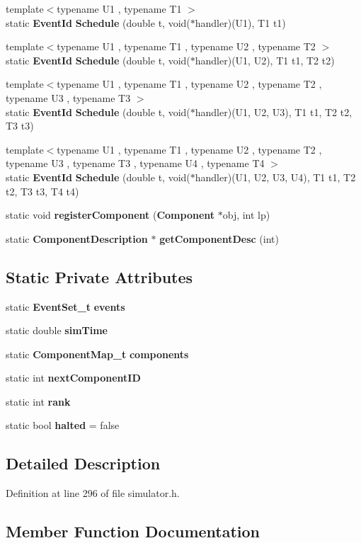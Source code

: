 \begin{CompactItemize}
{\footnotesize template$<$typename U1 , typename T1 $>$ }\\static {\bf EventId} {\bf Schedule} (double t, void($\ast$handler)(U1), T1 t1)
\item 
{\footnotesize template$<$typename U1 , typename T1 , typename U2 , typename T2 $>$ }\\static {\bf EventId} {\bf Schedule} (double t, void($\ast$handler)(U1, U2), T1 t1, T2 t2)
\item 
{\footnotesize template$<$typename U1 , typename T1 , typename U2 , typename T2 , typename U3 , typename T3 $>$ }\\static {\bf EventId} {\bf Schedule} (double t, void($\ast$handler)(U1, U2, U3), T1 t1, T2 t2, T3 t3)
\item 
{\footnotesize template$<$typename U1 , typename T1 , typename U2 , typename T2 , typename U3 , typename T3 , typename U4 , typename T4 $>$ }\\static {\bf EventId} {\bf Schedule} (double t, void($\ast$handler)(U1, U2, U3, U4), T1 t1, T2 t2, T3 t3, T4 t4)
\item 
static void {\bf registerComponent} ({\bf Component} $\ast$obj, int lp)
\item 
static {\bf ComponentDescription} $\ast$ {\bf getComponentDesc} (int)
\end{CompactItemize}
\subsection*{Static Private Attributes}
\begin{CompactItemize}
\item 
static {\bf EventSet\_\-t} {\bf events}
\item 
static double {\bf simTime}
\item 
static {\bf ComponentMap\_\-t} {\bf components}
\item 
static int {\bf nextComponentID}
\item 
static int {\bf rank}
\item 
static bool {\bf halted} = false
\end{CompactItemize}


\subsection{Detailed Description}


Definition at line 296 of file simulator.h.

\subsection{Member Function Documentation}
